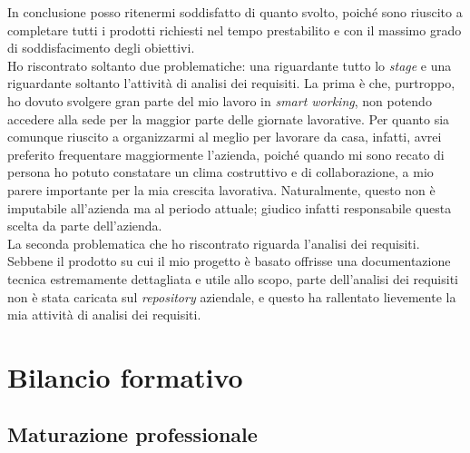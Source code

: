 In conclusione posso ritenermi soddisfatto di quanto svolto, poiché sono riuscito a completare tutti i prodotti richiesti nel tempo prestabilito e con il massimo grado di soddisfacimento degli obiettivi. \\
Ho riscontrato soltanto due problematiche: una riguardante tutto lo \textit{stage} e una riguardante soltanto l'attività di analisi dei requisiti. La prima è che, purtroppo, ho dovuto svolgere gran parte del mio lavoro in \textit{smart working}, non potendo accedere alla sede per la maggior parte delle giornate lavorative. Per quanto sia comunque riuscito a organizzarmi al meglio per lavorare da casa, infatti, avrei preferito frequentare maggiormente l'azienda, poiché quando mi sono recato di persona ho potuto constatare un clima costruttivo e di collaborazione, a mio parere importante per la mia crescita lavorativa. Naturalmente, questo non è imputabile all'azienda ma al periodo attuale; giudico infatti responsabile questa scelta da parte dell'azienda. \\
La seconda problematica che ho riscontrato riguarda l'analisi dei requisiti. Sebbene il prodotto su cui il mio progetto è basato offrisse una documentazione tecnica estremamente dettagliata e utile allo scopo, parte dell'analisi dei requisiti non è stata caricata sul \textit{repository} aziendale, e questo ha rallentato lievemente la mia attività di analisi dei requisiti.



\section{Bilancio formativo}

\subsection{Maturazione professionale}

